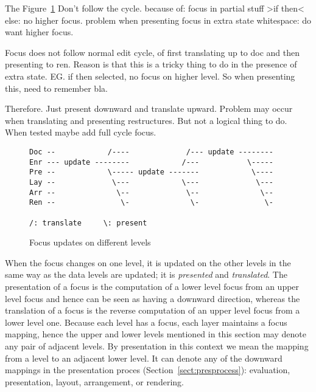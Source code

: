 The 
Figure~\ref{focusUpdates}
Don't follow the cycle. because of:
focus in partial stuff   >if then< else: no higher focus. problem when presenting
focus in extra state whitespace: do want higher focus.

Focus does not follow normal edit cycle, of first translating up to doc and then presenting to ren. Reason is that this is a tricky thing to do in the presence of extra state. EG. if then selected, no focus on higher level. So when presenting this, need to remember bla. 

Therefore. Just present downward and translate upward. Problem may occur when translating and presenting restructures. But not a logical thing to do. When tested maybe add full cycle focus.


\begin{figure}
\begin{small}
\begin{center}
\begin{verbatim}
Doc --            /----             /--- update --------
Enr --- update --------            /---           \-----
Pre --            \----- update -------            \----
Lay --             \---            \---             \---
Arr --              \--             \--              \--
Ren --               \-              \-               \-

/: translate     \: present
\end{verbatim}
\caption{Focus updates on different levels}\label{focusUpdates} 
\end{center}
\end{small}
\end{figure}

When the focus changes on one level, it is updated on the other levels in the same way as the data levels are updated; it is {\em presented} and {\em translated}. The presentation of a focus is the computation of a lower level focus from an upper level focus and hence can be seen as having a downward direction, whereas the translation of a focus is the reverse computation of an upper level focus from a lower level one. Because each level has a focus, each layer maintains a focus mapping, hence the upper and lower levels mentioned in this section may denote any pair of adjacent levels. By presentation in this context we mean the mapping from a level to an adjacent lower level. It can denote any of the downward mappings in the presentation proces (Section~\ref{sect:presprocess}): evaluation, presentation, layout, arrangement, or rendering.

